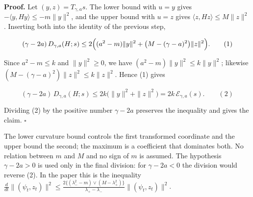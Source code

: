\documentclass[11pt,a4paper]{article}
\begin{document}
\textbf{Proof.} Let \((y,z)=T_{\gamma,a}s\). The lower bound with \(u=y\) gives \(-\langle y,Hy\rangle\le-m\|y\|^2\), and the upper bound with \(u=z\) gives \(\langle z,Hz\rangle\le M\|z\|^2\). Inserting both into the identity of the previous step,


\[(\gamma-2a)\,D_{\gamma,a}(H;s)\le2\Bigl((a^2-m)\|y\|^2+\bigl(M-(\gamma-a)^2\bigr)\|z\|^2\Bigr).\qquad(1)\]


Since \(a^2-m\le k\) and \(\|y\|^2\ge0\), we have \((a^2-m)\|y\|^2\le k\|y\|^2\); likewise \((M-(\gamma-a)^2)\|z\|^2\le k\|z\|^2\). Hence (1) gives


\[(\gamma-2a)\,D_{\gamma,a}(H;s)\le2k\bigl(\|y\|^2+\|z\|^2\bigr)=2k\,\mathcal E_{\gamma,a}(s).\qquad(2)\]


Dividing (2) by the positive number \(\gamma-2a\) preserves the inequality and gives the claim. \(\square\)




The lower curvature bound controls the first transformed coordinate and the upper bound the second; the maximum is a coefficient that dominates both. No relation between \(m\) and \(M\) and no sign of \(m\) is assumed. The hypothesis \(\gamma-2a>0\) is used only in the final division: for \(\gamma-2a<0\) the division would reverse (2). In the paper this is the inequality \(\frac{d}{dt}\|(\psi_t,z_t)\|^2\le\frac{2\{(\lambda_-^2-m)\vee(M-\lambda_+^2)\}}{\lambda_+-\lambda_-}\|(\psi_t,z_t)\|^2\).
\end{document}
